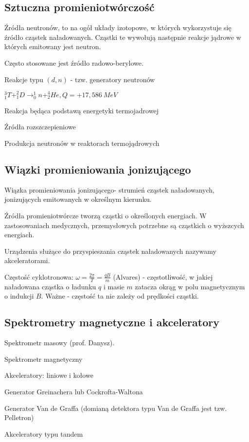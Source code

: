\documentclass{article}
\begin{document}
\subsection{Sztuczna promieniotwórczość}

Źródła neutronów, to na ogół układy izotopowe, w których wykorzystuje się źródło cząstek naładowanych. Cząstki te wywołują następnie reakcje jądrowe w których emitowany jest neutron.

Często stosowane jest źródło radowo-berylowe.

Reakcje typu $(d,n)$ - tzw. generatory neutronów

$_1^3T + _1^2D \rightarrow _0^1n + _2^4He, Q=+17,586~MeV$

Reakcja będąca podstawą energetyki termojadrowej

Źródła rozszczepieniowe

Produkcja neutronów w reaktorach termojądrowych

\subsection{Wiązki promieniowania jonizującego}

Wiązka promieniowania jonizującego- strumień cząstek naładowanych, jonizujących emitowanych w określnym kierunku.

Źródła promieniotwórcze tworzą cząstki o określonych energiach. W zastosowaniach medycznych, przemysłowych potrzebne są cząstkich o wyższcych energiach.

Urządzenia służące do przyspieszania cząstek naładowanych nazywamy akceleratorami.

Częstość cyklotronowa: $\omega = \frac{2\pi}{T} = \frac{qB}{m}$ (Alvares) - częstotliwość, w jakiej naładowana cząstka o ładunku $q$ i masie $m$ zatacza okrąg w polu magnetycznym o indukcji $B$. Ważne - częstość ta nie zależy od prędkości cząstki.

\subsection{Spektrometry magnetyczne i akceleratory}

Spektrometr masowy (prof. Danysz).

Spektrometr magnetyczny

Akceleratory: liniowe i kołowe

Generator Greinachera lub Cockrofta-Waltona

Generator Van de Graffa (domianą detektora typu Van de Graffa jest tzw. Pelletron)

Akceleratory typu tandem
\end{document}
